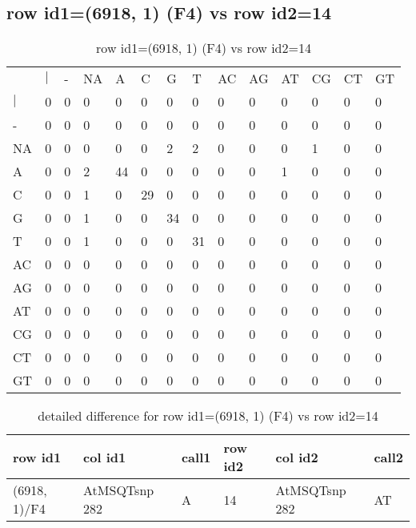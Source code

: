 \subsection{row id1=(6918, 1) (F4) vs row id2=14}
\begin{center}
\begin{longtable}{|l|l|l|l|l|l|l|l|l|l|l|l|l|l|}
\caption{row id1=(6918, 1) (F4) vs row id2=14} \label{table_dm98}\\
\hline
\\
\hline
&$|$&-&NA&A&C&G&T&AC&AG&AT&CG&CT&GT\\
$|$&0&0&0&0&0&0&0&0&0&0&0&0&0\\
-&0&0&0&0&0&0&0&0&0&0&0&0&0\\
NA&0&0&0&0&0&2&2&0&0&0&1&0&0\\
A&0&0&2&44&0&0&0&0&0&1&0&0&0\\
C&0&0&1&0&29&0&0&0&0&0&0&0&0\\
G&0&0&1&0&0&34&0&0&0&0&0&0&0\\
T&0&0&1&0&0&0&31&0&0&0&0&0&0\\
AC&0&0&0&0&0&0&0&0&0&0&0&0&0\\
AG&0&0&0&0&0&0&0&0&0&0&0&0&0\\
AT&0&0&0&0&0&0&0&0&0&0&0&0&0\\
CG&0&0&0&0&0&0&0&0&0&0&0&0&0\\
CT&0&0&0&0&0&0&0&0&0&0&0&0&0\\
GT&0&0&0&0&0&0&0&0&0&0&0&0&0\\
\hline
\end{longtable}
\end{center}

\begin{center}
\begin{longtable}{|l|l|l|l|l|l|}
\caption{detailed difference for row id1=(6918, 1) (F4) vs row id2=14} \label{table_dm99}\\
\hline
row id1&col id1&call1&row id2&col id2&call2\\
\hline
(6918, 1)/F4&AtMSQTsnp 282&A&14&AtMSQTsnp 282&AT\\
\hline
\end{longtable}
\end{center}

